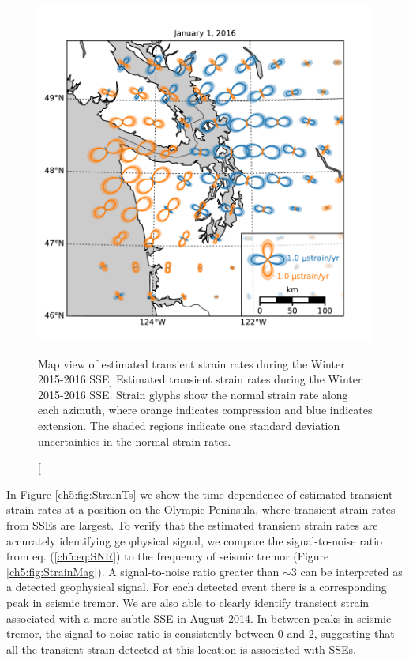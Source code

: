 \begin{figure}
\includegraphics{ch5/figures/strain_map/strain-map.pdf}
\caption
[Map view of estimated transient strain rates during the Winter
2015-2016 SSE]
{Estimated transient strain rates during the Winter 2015-2016
SSE. Strain glyphs show the normal strain rate along each azimuth,
where orange indicates compression and blue indicates extension. The
shaded regions indicate one standard deviation uncertainties in the
normal strain rates.}
\label{ch5:fig:StrainMap}
\end{figure}

In Figure \ref{ch5:fig:StrainTs} we show the time dependence of
estimated transient strain rates at a position on the Olympic
Peninsula, where transient strain rates from SSEs are largest. To
verify that the estimated transient strain rates are accurately
identifying geophysical signal, we compare the signal-to-noise ratio
from eq. (\ref{ch5:eq:SNR}) to the frequency of seismic tremor (Figure
\ref{ch5:fig:StrainMag}). A signal-to-noise ratio greater than
${\sim}3$ can be interpreted as a detected geophysical signal. For
each detected event there is a corresponding peak in seismic tremor.
We are also able to clearly identify transient strain associated with
a more subtle SSE in August 2014. In between peaks in seismic tremor,
the signal-to-noise ratio is consistently between 0 and 2, suggesting
that all the transient strain detected at this location is associated
with SSEs.

